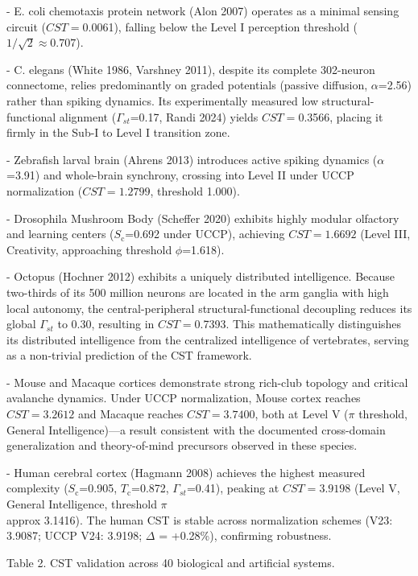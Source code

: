 \documentclass[a4paper,12pt]{article}
\begin{document}
- E. coli chemotaxis protein network (Alon 2007) operates as a minimal sensing circuit ($CST = $0.0061), falling below the Level I perception threshold ($1/\sqrt{2} \approx 0.707$).


- C. elegans (White 1986, Varshney 2011), despite its complete 302-neuron connectome, relies predominantly on graded potentials (passive diffusion, $\alpha$=2.56) rather than spiking dynamics. Its experimentally measured low structural-functional alignment ($\Gamma_{st}$=0.17, Randi 2024) yields $CST = $0.3566, placing it firmly in the Sub-I to Level I transition zone.


- Zebrafish larval brain (Ahrens 2013) introduces active spiking dynamics ($\alpha$=3.91) and whole-brain synchrony, crossing into Level II under UCCP normalization ($CST = 1.2799$, threshold 1.000).


- Drosophila Mushroom Body (Scheffer 2020) exhibits highly modular olfactory and learning centers ($S_{\text{c}}$=0.692 under UCCP), achieving $CST = 1.6692$ (Level III, Creativity, approaching threshold $\phi$=1.618).


- Octopus (Hochner 2012) exhibits a uniquely distributed intelligence. Because two-thirds of its 500 million neurons are located in the arm ganglia with high local autonomy, the central-peripheral structural-functional decoupling reduces its global $\Gamma_{st}$ to 0.30, resulting in $CST = $0.7393. This mathematically distinguishes its distributed intelligence from the centralized intelligence of vertebrates, serving as a non-trivial prediction of the CST framework.


- Mouse and Macaque cortices demonstrate strong rich-club topology and critical avalanche dynamics. Under UCCP normalization, Mouse cortex reaches $CST = 3.2612$ and Macaque reaches $CST = 3.7400$, both at Level V ($\pi$ threshold, General Intelligence)---a result consistent with the documented cross-domain generalization and theory-of-mind precursors observed in these species.


- Human cerebral cortex (Hagmann 2008) achieves the highest measured complexity ($S_{\text{c}}$=0.905, $T_{\text{c}}$=0.872, $\Gamma_{st}$=0.41), peaking at $CST = 3.9198$ (Level V, General Intelligence, threshold $\pi$  \\approx  3.1416). The human CST is stable across normalization schemes (V23: 3.9087; UCCP V24: 3.9198; $\Delta$ = +0.28\%), confirming robustness.


Table 2. CST validation across 40 biological and artificial systems.
\end{document}
